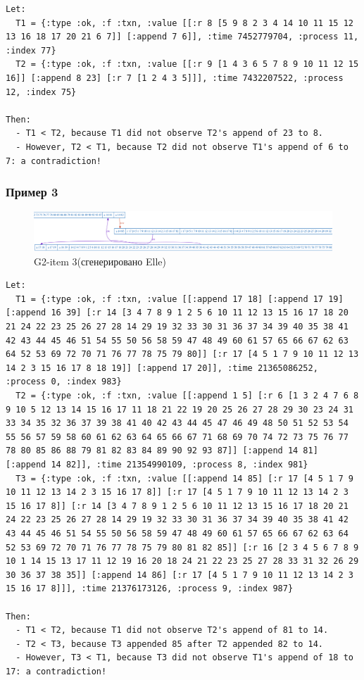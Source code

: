 \documentclass[12pt,  openany]{book}
\begin{document}
\begin{lstlisting}[caption={Пояснение к G2-item 2 аномалии (сгенерировано Elle)}]
Let:
  T1 = {:type :ok, :f :txn, :value [[:r 8 [5 9 8 2 3 4 14 10 11 15 12 13 16 18 17 20 21 6 7]] [:append 7 6]], :time 7452779704, :process 11, :index 77}
  T2 = {:type :ok, :f :txn, :value [[:r 9 [1 4 3 6 5 7 8 9 10 11 12 15 16]] [:append 8 23] [:r 7 [1 2 4 3 5]]], :time 7432207522, :process 12, :index 75}

Then:
  - T1 < T2, because T1 did not observe T2's append of 23 to 8.
  - However, T2 < T1, because T2 did not observe T1's append of 6 to 7: a contradiction!
\end{lstlisting}
\subsubsection{Пример 3}

\begin{figure}[H]
  \includegraphics[width=\textwidth]{strong/53.png}
  \caption{G2-item 3(сгенерировано Elle)}
\end{figure}
\par

\begin{lstlisting}[caption={Пояснение к G2-item 3 аномалии (сгенерировано Elle)}]
Let:
  T1 = {:type :ok, :f :txn, :value [[:append 17 18] [:append 17 19] [:append 16 39] [:r 14 [3 4 7 8 9 1 2 5 6 10 11 12 13 15 16 17 18 20 21 24 22 23 25 26 27 28 14 29 19 32 33 30 31 36 37 34 39 40 35 38 41 42 43 44 45 46 51 54 55 50 56 58 59 47 48 49 60 61 57 65 66 67 62 63 64 52 53 69 72 70 71 76 77 78 75 79 80]] [:r 17 [4 5 1 7 9 10 11 12 13 14 2 3 15 16 17 8 18 19]] [:append 17 20]], :time 21365086252, :process 0, :index 983}
  T2 = {:type :ok, :f :txn, :value [[:append 1 5] [:r 6 [1 3 2 4 7 6 8 9 10 5 12 13 14 15 16 17 11 18 21 22 19 20 25 26 27 28 29 30 23 24 31 33 34 35 32 36 37 39 38 41 40 42 43 44 45 47 46 49 48 50 51 52 53 54 55 56 57 59 58 60 61 62 63 64 65 66 67 71 68 69 70 74 72 73 75 76 77 78 80 85 86 88 79 81 82 83 84 89 90 92 93 87]] [:append 14 81] [:append 14 82]], :time 21354990109, :process 8, :index 981}
  T3 = {:type :ok, :f :txn, :value [[:append 14 85] [:r 17 [4 5 1 7 9 10 11 12 13 14 2 3 15 16 17 8]] [:r 17 [4 5 1 7 9 10 11 12 13 14 2 3 15 16 17 8]] [:r 14 [3 4 7 8 9 1 2 5 6 10 11 12 13 15 16 17 18 20 21 24 22 23 25 26 27 28 14 29 19 32 33 30 31 36 37 34 39 40 35 38 41 42 43 44 45 46 51 54 55 50 56 58 59 47 48 49 60 61 57 65 66 67 62 63 64 52 53 69 72 70 71 76 77 78 75 79 80 81 82 85]] [:r 16 [2 3 4 5 6 7 8 9 10 1 14 15 13 17 11 12 19 16 20 18 24 21 22 23 25 27 28 33 31 32 26 29 30 36 37 38 35]] [:append 14 86] [:r 17 [4 5 1 7 9 10 11 12 13 14 2 3 15 16 17 8]]], :time 21376173126, :process 9, :index 987}

Then:
  - T1 < T2, because T1 did not observe T2's append of 81 to 14.
  - T2 < T3, because T3 appended 85 after T2 appended 82 to 14.
  - However, T3 < T1, because T3 did not observe T1's append of 18 to 17: a contradiction!
\end{lstlisting}
\end{document}
